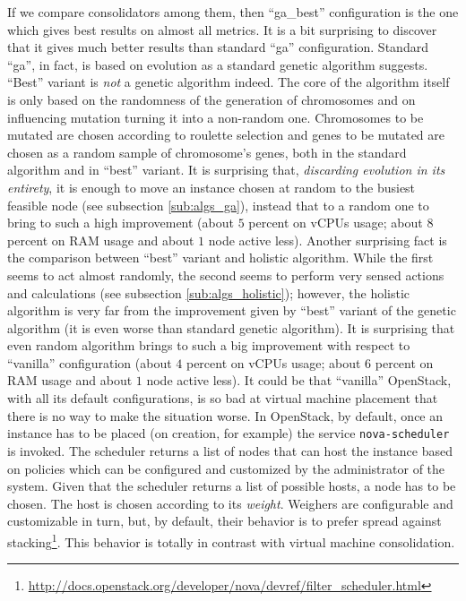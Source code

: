 If we compare consolidators among them, then ``ga\_best'' configuration is the one which gives best results on almost all metrics. It is a bit surprising to discover that it gives much better results than standard ``ga'' configuration. Standard ``ga'', in fact, is based on evolution as a standard genetic algorithm suggests. ``Best'' variant is \emph{not} a genetic algorithm indeed. The core of the algorithm itself is only based on the randomness of the generation of chromosomes and on influencing mutation turning it into a non-random one. Chromosomes to be mutated are chosen according to roulette selection and genes to be mutated are chosen as a random sample of chromosome's genes, both in the standard algorithm and in ``best'' variant. It is surprising that, \emph{discarding evolution in its entirety}, it is enough to move an instance chosen at random to the busiest feasible node (see subsection \ref{sub:algs_ga}), instead that to a random one to bring to such a high improvement (about $5$ percent on vCPUs usage; about $8$ percent on RAM usage and about $1$ node active less). Another surprising fact is the comparison between ``best'' variant and holistic algorithm. While the first seems to act almost randomly, the second seems to perform very sensed actions and calculations (see subsection \ref{sub:algs_holistic}); however, the holistic algorithm is very far from the improvement given by ``best'' variant of the genetic algorithm (it is even worse than standard genetic algorithm). It is surprising that even random algorithm brings to such a big improvement with respect to ``vanilla'' configuration (about $4$ percent on vCPUs usage; about $6$ percent on RAM usage and about $1$ node active less). It could be that ``vanilla'' OpenStack, with all its default configurations, is so bad at virtual machine placement that there is no way to make the situation worse. In OpenStack, by default, once an instance has to be placed (on creation, for example) the service \texttt{nova-scheduler} is invoked. The scheduler returns a list of nodes that can host the instance based on policies which can be configured and customized by the administrator of the system. Given that the scheduler returns a list of possible hosts, a node has to be chosen. The host is chosen according to its \emph{weight}. Weighers are configurable and customizable in turn, but, by default, their behavior is to prefer spread against stacking\footnote{\url{http://docs.openstack.org/developer/nova/devref/filter\_scheduler.html}}. This behavior is totally in contrast with virtual machine consolidation.

